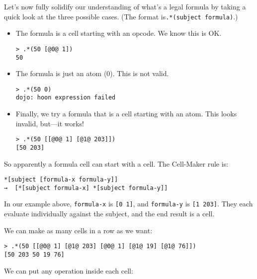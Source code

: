 \documentclass[twoside]{article}
\begin{document}
Let's now fully solidify our understanding of what's a legal formula by taking a quick look at the three possible cases. (The format is\lstinline[style=inlinecode]{.*(subject formula)}.)

\begin{itemize}

  \item  The formula is a cell starting with an opcode.  We know this is OK.

\begin{lstlisting}[style=listingblock]
> .*(50 [@0@ 1])
50
\end{lstlisting}

  \item  The formula is just an atom (0).  This is not valid.

\begin{lstlisting}[style=listingblock]
> .*(50 0)
dojo: hoon expression failed
\end{lstlisting}

  \item  Finally, we try a formula that is a cell starting with an atom.  This looks invalid, but—it works!

\begin{lstlisting}[style=listingblock]
> .*(50 [[@0@ 1] [@1@ 203]])
[50 203]
\end{lstlisting}

\end{itemize}

So apparently a formula cell can start with a cell. The Cell-Maker rule is:

\begin{lstlisting}[style=listingcode]
*[subject [formula-x formula-y]]
→  [*[subject formula-x] *[subject formula-y]]
\end{lstlisting}

In our example above, \lstinline[style=inlinecode]{formula-x} is \lstinline[style=inlinecode]{[0 1]}, and \lstinline[style=inlinecode]{formula-y} is \lstinline[style=inlinecode]{[1 203]}. They each evaluate individually against the subject, and the end result is a cell.

We can make as many cells in a row as we want:

\begin{lstlisting}[style=listingblock]
> .*(50 [[@0@ 1] [@1@ 203] [@0@ 1] [@1@ 19] [@1@ 76]])
[50 203 50 19 76]
\end{lstlisting}

We can put any operation inside each cell:
\end{document}
